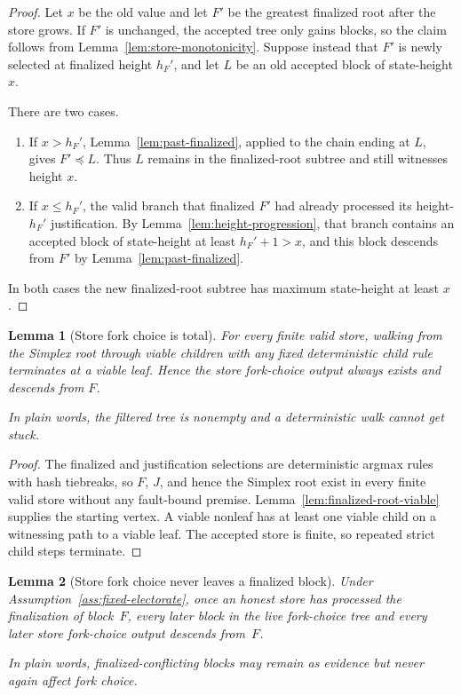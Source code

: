 \ifx\litemode\undefined\documentclass{article}\fi
\theoremstyle{plain}
\newtheorem{lemma}{Lemma}
\theoremstyle{definition}
\theoremstyle{remark}
\begin{document}
\begin{proof}
Let \(x\) be the old value and let \(F'\) be the greatest finalized root after
the store grows.  If \(F'\) is unchanged, the accepted tree only gains blocks,
so the claim follows from Lemma~\ref{lem:store-monotonicity}.  Suppose instead
that \(F'\) is newly selected at finalized height \(h_F'\), and let \(L\) be
an old accepted block of state-height \(x\).

There are two cases.
\begin{enumerate}
 \item If \(x>h_F'\), Lemma~\ref{lem:past-finalized}, applied to the chain
   ending at \(L\), gives \(F'\preceq L\).  Thus \(L\) remains in the
   finalized-root subtree and still witnesses height \(x\).
 \item If \(x\leq h_F'\), the valid branch that finalized \(F'\) had already
   processed its height-\(h_F'\) justification.  By
   Lemma~\ref{lem:height-progression}, that branch contains an accepted block
   of state-height at least \(h_F'+1>x\), and this block descends from \(F'\)
   by Lemma~\ref{lem:past-finalized}.
\end{enumerate}
In both cases the new finalized-root subtree has maximum state-height at least
\(x\).
\end{proof}

\begin{lemma}[Store fork choice is total]\label{lem:store-fork-choice-total}
For every finite valid store, walking from the Simplex root through viable
children with any fixed deterministic child rule terminates at a viable
leaf.  Hence the store fork-choice output always exists and descends from
\(F\).

In plain words, the filtered tree is nonempty and a deterministic walk cannot
get stuck.
\end{lemma}

\begin{proof}
The finalized and justification selections are deterministic argmax rules
with hash tiebreaks, so \(F\), \(J\), and hence the Simplex root exist
in every finite valid store without any fault-bound premise.
Lemma~\ref{lem:finalized-root-viable} supplies the starting vertex.  A viable
nonleaf has at least one viable child on a witnessing path to a viable leaf.
The accepted store is finite, so repeated strict child steps terminate.
\end{proof}

\begin{lemma}[Store fork choice never leaves a finalized block]\label{lem:finalized-lockin}
Under Assumption~\ref{ass:fixed-electorate}, once an honest store has processed
the finalization of block~\(F\), every later block in the live fork-choice tree
and every later store fork-choice output descends from~\(F\).

In plain words, finalized-conflicting blocks may remain as evidence but never
again affect fork choice.
\end{lemma}
\end{document}
